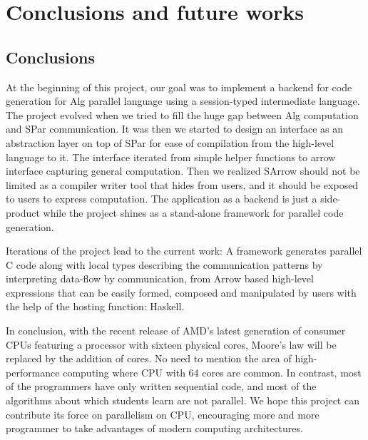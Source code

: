 \chapter{Conclusions and future works}
\section{Conclusions}
At the beginning of this project, our goal was to implement a backend for code generation for Alg parallel language using a session-typed intermediate language. The project evolved when we tried to fill the huge gap between Alg computation and SPar communication. It was then we started to design an interface as an abstraction layer on top of SPar for ease of compilation from the high-level language to it. The interface iterated from simple helper functions to arrow interface capturing general computation. Then we realized SArrow should not be limited as a compiler writer tool that hides from users, and it should be exposed to users to express computation. The application as a backend is just a side-product while the project shines as a stand-alone framework for parallel code generation. 

Iterations of the project lead to the current work: A framework generates parallel C code along with local types describing the communication patterns by interpreting data-flow by communication, from Arrow based high-level expressions that can be easily formed, composed and manipulated by users with the help of the hosting function: Haskell.

In conclusion, with the recent release of AMD's latest generation of consumer CPUs featuring a processor with sixteen physical cores, Moore's law will be replaced by the addition of cores. No need to mention the area of high-performance computing where CPU with 64 cores are common. In contrast, most of the programmers have only written sequential code, and most of the algorithms about which students learn are not parallel. We hope this project can contribute its force on parallelism on CPU, encouraging more and more programmer to take advantages of modern computing architectures.
